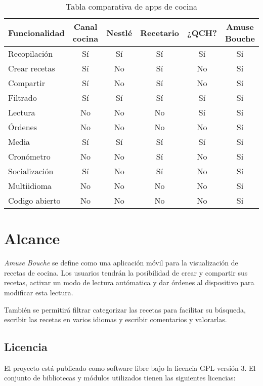 \begin{table}[h]
  \centering
  \begin{tabular}{|l|c|c|c|c|c|}
    \hline
    \textbf{Funcionalidad} & \textbf{Canal cocina} & \textbf{Nestlé} &
    \textbf{Recetario} & \textbf{¿QCH?} & \textbf{Amuse Bouche}\\
    \hline
    Recopilación & Sí & Sí & Sí & Sí & Sí \\
    \hline
    Crear recetas & Sí & No & Sí & No & Sí \\
    \hline
    Compartir & Sí & No & Sí & No & Sí \\
    \hline
    Filtrado & Sí & Sí & Sí & Sí & Sí \\
    \hline
    Lectura & No & No & No & Sí & Sí \\
    \hline
    Órdenes & No & No & No & No & Sí \\
    \hline
    Media & Sí & Sí & Sí & Sí & Sí \\
    \hline
    Cronómetro & No & No & Sí & No & Sí \\
    \hline
    Socialización & Sí & No & Sí & No & Sí \\
    \hline
    Multiidioma & No & No & No & No & Sí \\
    \hline
    Codigo abierto & No & No & No & No & Sí \\
    \hline
  \end{tabular}
  \caption{Tabla comparativa de apps de cocina}
  \label{comparativa_apps}
\end{table}


\section{Alcance}

\textit{Amuse Bouche} se define como una aplicación móvil para la visualización
de recetas de cocina. Los usuarios tendrán la posibilidad de crear y compartir
sus recetas, activar un modo de lectura autómatica y dar órdenes al dispositivo
para modificar esta lectura.

También se permitirá filtrar categorizar las recetas para facilitar su búsqueda,
escribir las recetas en varios idiomas y escribir comentarios y valorarlas.


\subsection{Licencia}
El proyecto está publicado como software libre bajo la licencia
\ac{GPL} versión 3. El conjunto de bibliotecas y módulos utilizados
tienen las siguientes licencias:

